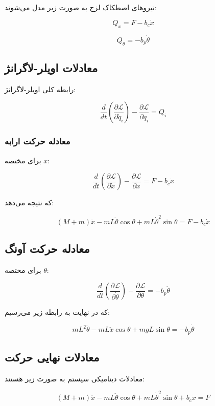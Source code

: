 \documentclass[a4paper,12pt]{article}
\begin{document}
نیروهای اصطکاک لزج به صورت زیر مدل می‌شوند:

\[
    Q_x = F - b_c\dot{x}
\]

\[
    Q_\theta = -b_p\dot{\theta}
\]

\subsection{معادلات اویلر-لاگرانژ}

رابطه کلی اویلر-لاگرانژ:

\[
    \frac{d}{dt}
    \left(
    \frac{\partial \mathcal{L}}
    {\partial \dot{q}_i}
    \right)
    -
    \frac{\partial \mathcal{L}}
    {\partial q_i}
    =
    Q_i
\]

\subsubsection{معادله حرکت ارابه}

برای مختصه $x$:

\[
    \frac{d}{dt}
    \left(
    \frac{\partial \mathcal{L}}
    {\partial \dot{x}}
    \right)
    -
    \frac{\partial \mathcal{L}}
    {\partial x}
    =
    F - b_c\dot{x}
\]

که نتیجه می‌دهد:

\[
    (M+m)\ddot{x}
    -
    mL\ddot{\theta}\cos\theta
    +
    mL\dot{\theta}^2\sin\theta
    =
    F - b_c\dot{x}
\]

\subsection{معادله حرکت آونگ}

برای مختصه $\theta$:

\[
    \frac{d}{dt}
    \left(
    \frac{\partial \mathcal{L}}
    {\partial \dot{\theta}}
    \right)
    -
    \frac{\partial \mathcal{L}}
    {\partial \theta}
    =
    -b_p\dot{\theta}
\]

که در نهایت به رابطه زیر می‌رسیم:

\[
    mL^2\ddot{\theta}
    -
    mL\ddot{x}\cos\theta
    +
    mgL\sin\theta
    =
    -b_p\dot{\theta}
\]

\subsection{معادلات نهایی حرکت}

معادلات دینامیکی سیستم به صورت زیر هستند:

\[
    (M+m)\ddot{x}
    -
    mL\ddot{\theta}\cos\theta
    +
    mL\dot{\theta}^2\sin\theta
    +
    b_c\dot{x}
    =
    F
\]
\end{document}
